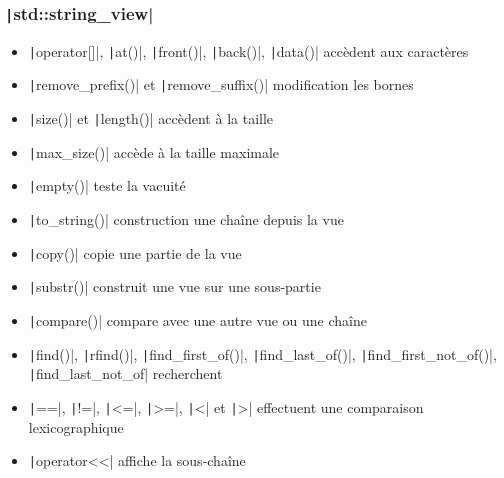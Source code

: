 \documentclass[C++.tex]{subfiles}
\begin{document}
\begin{frame}[fragile]
	\frametitle{\texttt|std::string_view|}
	\begin{itemize}
		\item \texttt|operator[]|, \texttt|at()|, \texttt|front()|, \texttt|back()|, \texttt|data()| accèdent aux caractères
		\item \texttt|remove_prefix()| et \texttt|remove_suffix()| modification les bornes
		\item \texttt|size()| et \texttt|length()| accèdent à la taille
		\item \texttt|max_size()| accède à la taille maximale
		\item \texttt|empty()| teste la vacuité
		\item \texttt|to_string()| construction une chaîne depuis la vue
		\item \texttt|copy()| copie une partie de la vue
		\item \texttt|substr()| construit une vue sur une sous-partie
		\item \texttt|compare()| compare avec une autre vue ou une chaîne
		\item \texttt|find()|, \texttt|rfind()|, \texttt|find_first_of()|, \texttt|find_last_of()|, \texttt|find_first_not_of()|, \texttt|find_last_not_of| recherchent
		\item \texttt|==|, \texttt|!=|, \texttt|<=|, \texttt|>=|, \texttt|<| et \texttt|>| effectuent une comparaison lexicographique
		\item \texttt|operator<<| affiche la sous-chaîne
	\end{itemize}

\end{frame}
\end{document}
